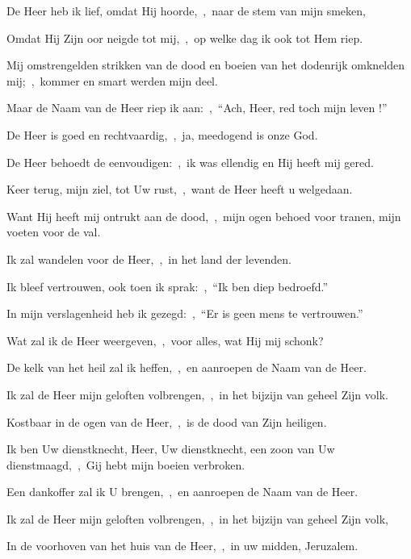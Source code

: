 \documentclass[12pt,twoside,a5paper]{article}
\begin{document}
\begin{halfparskip}

   De Heer heb ik lief, omdat Hij hoorde,~\sep\ naar de stem van mijn smeken,

  Omdat Hij Zijn oor neigde tot mij,~\sep\ op welke dag ik ook tot Hem riep.


  Mij omstrengelden strikken van de dood en boeien van het dodenrijk omknelden mij;~\sep\ kommer en smart werden mijn deel.

  Maar de Naam van de Heer riep ik aan:~\sep\ ``Ach, Heer, red toch mijn leven !''

  De Heer is goed en rechtvaardig,~\sep\ ja, meedogend is onze God.

  De Heer behoedt de eenvoudigen:~\sep\ ik was ellendig en Hij heeft mij gered.

  Keer terug, mijn ziel, tot Uw rust,~\sep\ want de Heer heeft u welgedaan.

  Want Hij heeft mij ontrukt aan de dood,~\sep\ mijn ogen behoed voor tranen, mijn voeten voor de val.

  Ik zal wandelen voor de Heer,~\sep\ in het land der levenden.

  Ik bleef vertrouwen, ook toen ik sprak:~\sep\ ``Ik ben diep bedroefd.''

  In mijn verslagenheid heb ik gezegd:~\sep\ ``Er is geen mens te vertrouwen.''

  Wat zal ik de Heer weergeven,~\sep\ voor alles, wat Hij mij schonk?

  De kelk van het heil zal ik heffen,~\sep\ en aanroepen de Naam van de Heer.

  Ik zal de Heer mijn geloften volbrengen,~\sep\ in het bijzijn van geheel Zijn volk.

  Kostbaar in de ogen van de Heer,~\sep\ is de dood van Zijn heiligen.

  Ik ben Uw dienstknecht, Heer, Uw dienstknecht, een zoon van Uw dienstmaagd,~\sep\ Gij hebt mijn boeien verbroken.

  Een dankoffer zal ik U brengen,~\sep\ en aanroepen de Naam van de Heer.

  Ik zal de Heer mijn geloften volbrengen,~\sep\ in het bijzijn van geheel Zijn volk,

  In de voorhoven van het huis van de Heer,~\sep\ in uw midden, Jeruzalem.


\end{halfparskip}
\end{document}
